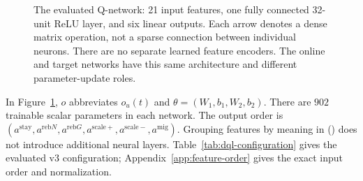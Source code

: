 \begin{figure}[!htbp]
\centering
{}
\caption{The evaluated Q-network: 21 input features, one fully connected
32-unit ReLU layer, and six linear outputs. Each arrow denotes a dense matrix
operation, not a sparse connection between individual neurons. There are no
separate learned feature encoders. The online and target networks have this
same architecture and different parameter-update roles.}
\label{fig:dql_q_network_tree}
\end{figure}

In Figure~\ref{fig:dql_q_network_tree}, $o$ abbreviates $o_u(t)$ and
$\theta=(W_1,b_1,W_2,b_2)$. There are $902$ trainable scalar parameters in
each network. The output order is
$(a^{\mathrm{stay}},a^{\mathrm{reb}N},a^{\mathrm{reb}G},
a^{\mathrm{scale}+},a^{\mathrm{scale}-},a^{\mathrm{mig}})$.
Grouping features by meaning in () does not introduce
additional neural layers. Table~\ref{tab:dql-configuration} gives the
evaluated v3 configuration; Appendix~\ref{app:feature-order} gives the exact
input order and normalization.

